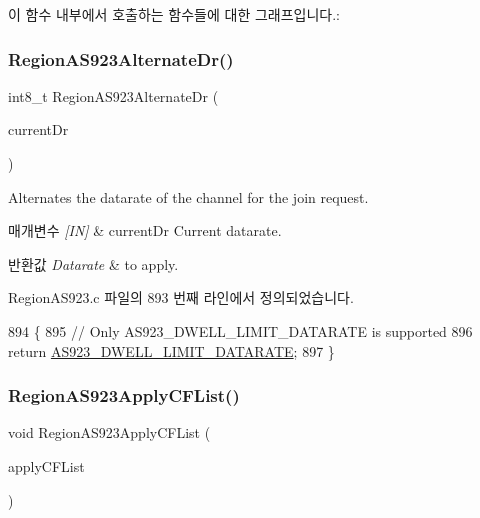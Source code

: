 이 함수 내부에서 호출하는 함수들에 대한 그래프입니다.\+:
\mbox{\label{group___r_e_g_i_o_n_a_s923_ga015999d2289b518bb0198915fcfbc822}} 
\subsubsection{\texorpdfstring{Region\+A\+S923\+Alternate\+Dr()}{RegionAS923AlternateDr()}}
{\footnotesize\ttfamily int8\+\_\+t Region\+A\+S923\+Alternate\+Dr (\begin{DoxyParamCaption}\item[{int8\+\_\+t}]{current\+Dr }\end{DoxyParamCaption})}



Alternates the datarate of the channel for the join request. 


\begin{DoxyParams}{매개변수}
{\em \mbox{[}\+I\+N\mbox{]}} & current\+Dr Current datarate.\\
\hline
\end{DoxyParams}

\begin{DoxyRetVals}{반환값}
{\em Datarate} & to apply. \\
\hline
\end{DoxyRetVals}


Region\+A\+S923.\+c 파일의 893 번째 라인에서 정의되었습니다.


\begin{DoxyCode}
894 \{
895     \textcolor{comment}{// Only AS923\_DWELL\_LIMIT\_DATARATE is supported}
896     \textcolor{keywordflow}{return} \mbox{\hyperlink{group___r_e_g_i_o_n_a_s923_gab4d42ec6203089aa346cd55d90eb769e}{AS923\_DWELL\_LIMIT\_DATARATE}};
897 \}
\end{DoxyCode}
\mbox{\label{group___r_e_g_i_o_n_a_s923_ga06106e86f717362c50165a5adaf73331}} 
\subsubsection{\texorpdfstring{Region\+A\+S923\+Apply\+C\+F\+List()}{RegionAS923ApplyCFList()}}
{\footnotesize\ttfamily void Region\+A\+S923\+Apply\+C\+F\+List (\begin{DoxyParamCaption}\item[{\mbox{\hyperlink{group___r_e_g_i_o_n_ga71588e9ad07e34b78fa91d51881fd3c6}{Apply\+C\+F\+List\+Params\+\_\+t}} $\ast$}]{apply\+C\+F\+List }\end{DoxyParamCaption})}



